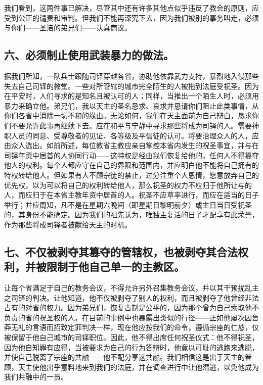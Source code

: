 我们看到，这两件事已解决，尽管其中还有许多其他点似乎违反了教会的原则，应受到公正的谴责和审判。但我们不能再深究下去，因为我们被别的事务叫走，必须与你们——圣洁的弟兄们——认真商议。\par


\subsection{六、必须制止使用武装暴力的做法。}

据我们所知，一队兵士跟随司铎穿越各省，协助他依靠武力支持，暴烈地入侵那些失去自己司铎的教堂。一些对所管辖的城市完全陌生的人被拖到法庭受祝圣。因为在平安时，人们寻求的是知名且被认可的人；同样，当推出一个陌生人时，必须用暴力来确立他。弟兄们，我以天主的圣名恳求、哀求并恳请你们阻止此类事情，从你们各省中消除一切不和的缘由。无论如何，我们在天主面前为自己辩白，恳求你们不要允许此事再继续下去。应在和平与宁静中寻求那些将成为司铎的人。需要神职人员的同意、受尊敬者的见证、各等级及平信徒的认可。将要治理众人的人，应由众人选出。如前所述，每位教省主教应亲自掌控本省内发生的祝圣事宜，并与在司铎年资中居首的人协同行动——这特权是经由我们恢复给他的。任何人不得篡夺他人的权利。每个人都应守在自己的界限和范围内，并应明白他不能将自己拥有的特权转给他人。但如果有人不顾宗徒的禁止，过分注重个人恩情，愿意放弃自己的优先权，以为可以将自己的权利转给他人，那么祝圣的权力不应归于他所让与的人，而应归于在本省主教年资中居首的人。祝圣不应草率进行，而应在适当的日子举行；并应周知，凡不是在星期六晚间（即星期日黎明前夕）或主日当日受祝圣的，其身份不能确定。因为我们的祖先认为，唯独主复活的日子才配享有此荣誉，作为那些将成司铎者被献给天主的时机。\par


\subsection{七、不仅被剥夺其篡夺的管辖权，也被剥夺其合法权利，并被限制于他自己单一的主教区。}

让每个省满足于自己的教务会议，不得允许另外召集教务会议，并以其干预扰乱主之司铎的判决。让他知道，他不仅被剥夺了别人的权利，而且被剥夺了他曾经非法占有的对省的权力。因为弟兄们，恢复古制是公平的，因为那个曾为自己索取他不负责的省的祝圣权的人，在目前的事例中也暴露出类似的行径——正如他屡次因鲁莽无礼的言语而招致定罪判决一样，现在他应按我们的命令，遵循宗座的仁慈，仅被保留于他自己城市的司铎职位。因此，他不得出席任何祝圣仪式：他不得祝圣，因为他自知罪有应得，当被要求为自己的行为答辩时，他竟以可耻的逃跑来逃脱，并使自己脱离了宗座的共融——他不配分享这共融。我们相信这是出于天主的眷顾，天主使他出乎意料地来到我们的法庭，并在调查进行中让他潜逃，以免他成为我们共融中的一员。\par

